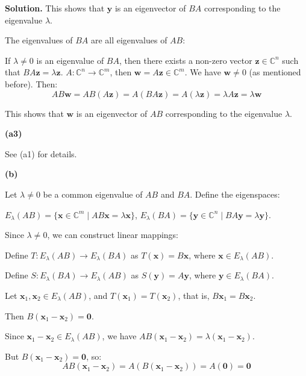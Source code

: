 \documentclass[12pt, a4paper, oneside]{ctexart}
\newenvironment{solution}{\par\noindent\textbf{Solution. }}{\par}
\begin{document}
\begin{solution}
This shows that $ \mathbf{y} $ is an eigenvector of $ BA $ corresponding to the eigenvalue $ \lambda $.

The eigenvalues of $BA$ are all eigenvalues of $AB$:

If $ \lambda\neq0 $ is an eigenvalue of $ BA $, then there exists a non-zero vector $ \mathbf{z}\in\mathbb{C}^n $ such that $ BA\mathbf{z}=\lambda\mathbf{z} $. $ A:\mathbb{C}^n\to\mathbb{C}^m $, then $ \mathbf{w}=A\mathbf{z}\in\mathbb{C}^m $. We have $ \mathbf{w}\neq0 $ (as mentioned before). Then:
$$
AB\mathbf{w}=AB(A\mathbf{z})=A(BA\mathbf{z})=A(\lambda\mathbf{z})=\lambda A\mathbf{z}=\lambda\mathbf{w}
$$

This shows that $ \mathbf{w} $ is an eigenvector of $ AB $ corresponding to the eigenvalue $ \lambda $.

\vspace{12pt}

\textbf{(a3)}

See (a1) for details.

\vspace{12pt}

\textbf{(b)}

Let $ \lambda\neq 0 $ be a common eigenvalue of $ AB $ and $ BA $. Define the eigenspaces:

$ E_{\lambda}(AB)=\{ \mathbf{x}\in\mathbb{C}^m\mid AB\mathbf{x}=\lambda\mathbf{x}\} $, $ E_{\lambda}(BA)=\{ \mathbf{y}\in\mathbb{C}^n\mid BA\mathbf{y}=\lambda\mathbf{y}\} $.

Since $ \lambda\neq 0 $, we can construct linear mappings:

Define $ T: E_{\lambda}(AB)\to E_{\lambda}(BA) $ as $ T(\mathbf{x}) = B\mathbf{x} $, where $ \mathbf{x}\in E_{\lambda}(AB) $.

Define $ S: E_{\lambda}(BA)\to E_{\lambda}(AB) $ as $ S(\mathbf{y}) = A\mathbf{y} $, where $ \mathbf{y}\in E_{\lambda}(BA) $.

Let $ \mathbf{x}_1,\mathbf{x}_2\in E_{\lambda}(AB) $, and $ T(\mathbf{x}_1)=T(\mathbf{x}_2) $, that is, $ B\mathbf{x}_1 = B\mathbf{x}_2 $.

Then $ B(\mathbf{x}_1 - \mathbf{x}_2)=\mathbf{0} $.

Since $ \mathbf{x}_1 - \mathbf{x}_2\in E_{\lambda}(AB) $, we have $ AB(\mathbf{x}_1 - \mathbf{x}_2)=\lambda(\mathbf{x}_1 - \mathbf{x}_2) $.

But $ B(\mathbf{x}_1 - \mathbf{x}_2)=\mathbf{0} $, so:
$$
AB(\mathbf{x}_1 - \mathbf{x}_2)=A(B(\mathbf{x}_1 - \mathbf{x}_2))=A(\mathbf{0})=\mathbf{0}
$$


\end{solution}
\end{document}
